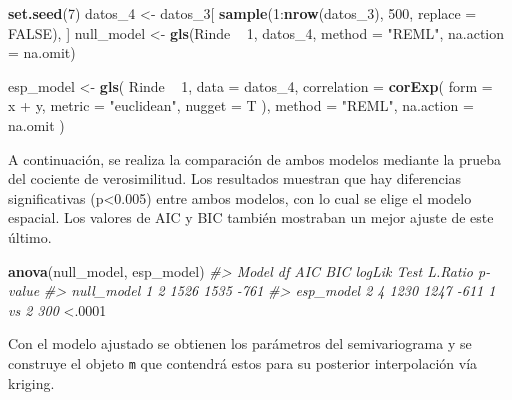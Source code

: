 \documentclass[11pt,b5paper,]{krantz}
\newenvironment{Shaded}{}{}
\newcommand{\CommentTok}[1]{\textcolor[rgb]{0.38,0.63,0.69}{\textit{#1}}}
\newcommand{\DataTypeTok}[1]{\textcolor[rgb]{0.56,0.13,0.00}{#1}}
\newcommand{\DecValTok}[1]{\textcolor[rgb]{0.25,0.63,0.44}{#1}}
\newcommand{\KeywordTok}[1]{\textcolor[rgb]{0.00,0.44,0.13}{\textbf{#1}}}
\newcommand{\NormalTok}[1]{#1}
\newcommand{\OperatorTok}[1]{\textcolor[rgb]{0.40,0.40,0.40}{#1}}
\newcommand{\OtherTok}[1]{\textcolor[rgb]{0.00,0.44,0.13}{#1}}
\newcommand{\StringTok}[1]{\textcolor[rgb]{0.25,0.44,0.63}{#1}}
\begin{document}
\begin{Shaded}
\begin{Highlighting}[]
\KeywordTok{set.seed}\NormalTok{(}\DecValTok{7}\NormalTok{)}
\NormalTok{datos_}\DecValTok{4}\NormalTok{ <-}\StringTok{ }\NormalTok{datos_}\DecValTok{3}\NormalTok{[}
  \KeywordTok{sample}\NormalTok{(}\DecValTok{1}\OperatorTok{:}\KeywordTok{nrow}\NormalTok{(datos_}\DecValTok{3}\NormalTok{), }
         \DecValTok{500}\NormalTok{, }\DataTypeTok{replace =} \OtherTok{FALSE}\NormalTok{), ]}
\NormalTok{null_model <-}
\StringTok{  }\KeywordTok{gls}\NormalTok{(Rinde }\OperatorTok{~}\StringTok{ }\DecValTok{1}\NormalTok{, datos_}\DecValTok{4}\NormalTok{, }
      \DataTypeTok{method =} \StringTok{"REML"}\NormalTok{, }
      \DataTypeTok{na.action =}\NormalTok{ na.omit)}

\NormalTok{esp_model <-}\StringTok{ }\KeywordTok{gls}\NormalTok{(}
\NormalTok{  Rinde }\OperatorTok{~}\StringTok{ }\DecValTok{1}\NormalTok{,}
  \DataTypeTok{data =}\NormalTok{ datos_}\DecValTok{4}\NormalTok{,}
  \DataTypeTok{correlation =} \KeywordTok{corExp}\NormalTok{(}
    \DataTypeTok{form =}  \OperatorTok{~}\StringTok{ }\NormalTok{x }\OperatorTok{+}\StringTok{ }\NormalTok{y,}
    \DataTypeTok{metric =} \StringTok{"euclidean"}\NormalTok{,}
    \DataTypeTok{nugget =}\NormalTok{ T}
\NormalTok{  ),}
  \DataTypeTok{method =} \StringTok{"REML"}\NormalTok{,}
  \DataTypeTok{na.action =}\NormalTok{ na.omit}
\NormalTok{)}
\end{Highlighting}
\end{Shaded}

A continuación, se realiza la comparación de ambos modelos mediante la prueba del cociente de verosimilitud. Los resultados muestran que hay diferencias significativas (p\textless{}0.005) entre ambos modelos, con lo cual se elige el modelo espacial. Los valores de AIC y BIC también mostraban un mejor ajuste de este último.

\begin{Shaded}
\begin{Highlighting}[]
\KeywordTok{anova}\NormalTok{(null_model, esp_model)}
\CommentTok{#> Model df AIC BIC logLik Test L.Ratio p-value}
\CommentTok{#> null_model 1 2 1526 1535 -761}
\CommentTok{#> esp_model 2 4 1230 1247 -611 1 vs 2 300}
\OperatorTok{<}\NormalTok{.}\DecValTok{0001}
\end{Highlighting}
\end{Shaded}

Con el modelo ajustado se obtienen los parámetros del semivariograma y se construye el objeto \texttt{m} que contendrá estos para su posterior interpolación vía kriging.
\end{document}

